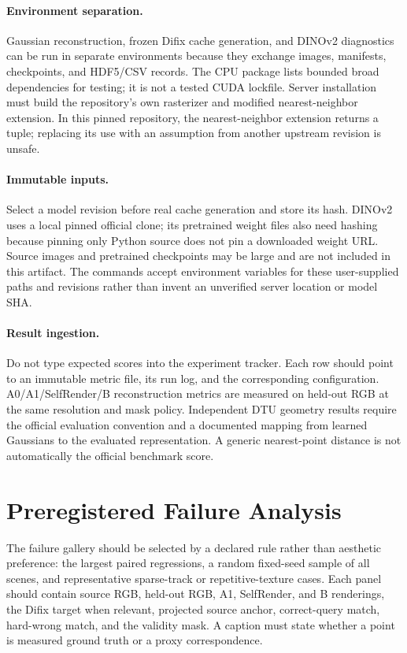 \documentclass[10pt,twocolumn,letterpaper]{article}
\begin{document}
\paragraph{Environment separation.} Gaussian reconstruction, frozen Difix cache generation, and DINOv2 diagnostics can be run in separate environments because they exchange images, manifests, checkpoints, and HDF5/CSV records. The CPU package lists bounded broad dependencies for testing; it is not a tested CUDA lockfile. Server installation must build the repository's own rasterizer and modified nearest-neighbor extension. In this pinned repository, the nearest-neighbor extension returns a tuple; replacing its use with an assumption from another upstream revision is unsafe.

\paragraph{Immutable inputs.} Select a model revision before real cache generation and store its hash. DINOv2 uses a local pinned official clone; its pretrained weight files also need hashing because pinning only Python source does not pin a downloaded weight URL. Source images and pretrained checkpoints may be large and are not included in this artifact. The commands accept environment variables for these user-supplied paths and revisions rather than invent an unverified server location or model SHA.

\paragraph{Result ingestion.} Do not type expected scores into the experiment tracker. Each row should point to an immutable metric file, its run log, and the corresponding configuration. A0/A1/SelfRender/B reconstruction metrics are measured on held-out RGB at the same resolution and mask policy. Independent DTU geometry results require the official evaluation convention and a documented mapping from learned Gaussians to the evaluated representation. A generic nearest-point distance is not automatically the official benchmark score.

\section{Preregistered Failure Analysis}
The failure gallery should be selected by a declared rule rather than aesthetic preference: the largest paired regressions, a random fixed-seed sample of all scenes, and representative sparse-track or repetitive-texture cases. Each panel should contain source RGB, held-out RGB, A1, SelfRender, and B renderings, the Difix target when relevant, projected source anchor, correct-query match, hard-wrong match, and the validity mask. A caption must state whether a point is measured ground truth or a proxy correspondence.
\end{document}
